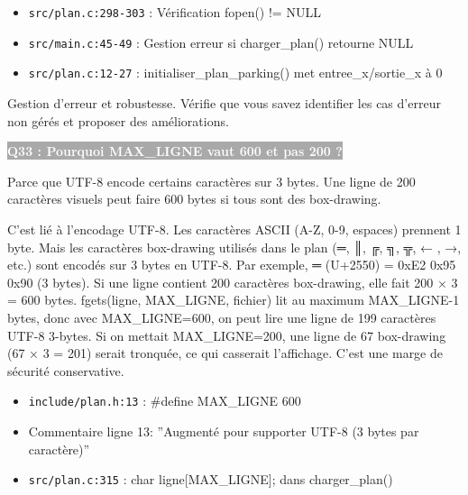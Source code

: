 \documentclass[12pt,a4paper]{article}
\newcommand{\question}[1]{%
    \vspace{0.5cm}
    \noindent\colorbox{darkgray}{\textcolor{white}{\textbf{#1}}}
    \vspace{0.3cm}
}
\begin{document}
\begin{reference_code}
\begin{itemize}
    \item \texttt{src/plan.c:298-303} : Vérification fopen() != NULL
    \item \texttt{src/main.c:45-49} : Gestion erreur si charger\_plan() retourne NULL
    \item \texttt{src/plan.c:12-27} : initialiser\_plan\_parking() met entree\_x/sortie\_x à 0
\end{itemize}
\end{reference_code}

\begin{objectif_prof}
Gestion d'erreur et robustesse. Vérifie que vous savez identifier les cas d'erreur non gérés et proposer des améliorations.
\end{objectif_prof}

\question{Q33 : Pourquoi MAX\_LIGNE vaut 600 et pas 200 ?}

\begin{reponse_courte}
Parce que UTF-8 encode certains caractères sur 3 bytes. Une ligne de 200 caractères visuels peut faire 600 bytes si tous sont des box-drawing.
\end{reponse_courte}

\begin{reponse_longue}
C'est lié à l'encodage UTF-8. Les caractères ASCII (A-Z, 0-9, espaces) prennent 1 byte. Mais les caractères box-drawing utilisés dans le plan (═, ║, ╔, ╗, ╦, ← , →, etc.) sont encodés sur 3 bytes en UTF-8. Par exemple, ═ (U+2550) = 0xE2 0x95 0x90 (3 bytes). Si une ligne contient 200 caractères box-drawing, elle fait 200 × 3 = 600 bytes. fgets(ligne, MAX\_LIGNE, fichier) lit au maximum MAX\_LIGNE-1 bytes, donc avec MAX\_LIGNE=600, on peut lire une ligne de 199 caractères UTF-8 3-bytes. Si on mettait MAX\_LIGNE=200, une ligne de 67 box-drawing (67 × 3 = 201) serait tronquée, ce qui casserait l'affichage. C'est une marge de sécurité conservative.
\end{reponse_longue}

\begin{reference_code}
\begin{itemize}
    \item \texttt{include/plan.h:13} : \#define MAX\_LIGNE 600
    \item Commentaire ligne 13: ''Augmenté pour supporter UTF-8 (3 bytes par caractère)''
    \item \texttt{src/plan.c:315} : char ligne[MAX\_LIGNE]; dans charger\_plan()
\end{itemize}
\end{reference_code}
\end{document}
